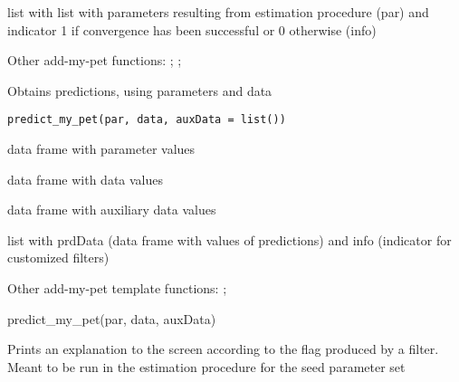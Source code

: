 \documentclass[a4paper]{book}
\begin{document}
%
\begin{Value}
list with list with parameters resulting from estimation procedure (par)
and indicator 1 if convergence has been successful or 0 otherwise (info)
\end{Value}
%
\begin{SeeAlso}\relax
Other add-my-pet functions: ;
; 
\end{SeeAlso}
%
\begin{Description}\relax
Obtains predictions, using parameters and data
\end{Description}
%
\begin{Usage}
\begin{verbatim}
predict_my_pet(par, data, auxData = list())
\end{verbatim}
\end{Usage}
%
\begin{Arguments}
\begin{ldescription}
\item[\code{par}] data frame with parameter values

\item[\code{data}] data frame with data values

\item[\code{auxData}] data frame with auxiliary data values
\end{ldescription}
\end{Arguments}
%
\begin{Value}
list with prdData (data frame with values of predictions) and info (indicator for customized filters)
\end{Value}
%
\begin{SeeAlso}\relax
Other add-my-pet template functions: ;
\end{SeeAlso}
%
\begin{Examples}
\begin{ExampleCode}
predict_my_pet(par, data, auxData)
\end{ExampleCode}
\end{Examples}
%
\begin{Description}\relax
Prints an explanation to the screen according to the flag produced by a filter.
Meant to be run in the estimation procedure for the seed parameter set
\end{Description}
\end{document}

